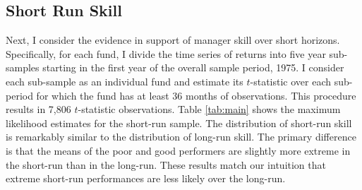 	\subsection{Short Run Skill}
		Next, I consider the evidence in support of manager skill over short horizons. Specifically, for each fund, I divide the time series of returns into five year sub-samples starting in the first year of the overall sample period, 1975. I consider each sub-sample as an individual fund and estimate its $t$-statistic over each sub-period for which the fund has at least 36 months of observations. This procedure results in 7,806 $t$-statistic observations. Table \ref{tab:main} shows the maximum likelihood estimates for the short-run sample. The distribution of short-run skill is remarkably similar to the distribution of long-run skill. The primary difference is that the means of the poor and good performers are slightly more extreme in the short-run than in the long-run. These results match our intuition that extreme short-run performances are less likely over the long-run.

